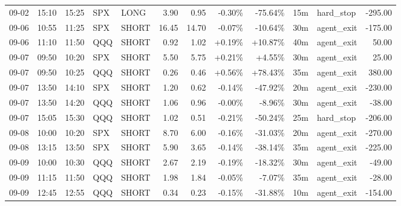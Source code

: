 \documentclass[11pt,a4paper,twoside]{article}
\begin{document}
\begin{center}
\begin{longtable}{>{\color{txtmain}}l l l l l r r r r r >{\color{txtmain}}l r}
09-02 & 15:10 & 15:25 & SPX & LONG & 3.90 & 0.95 & \textcolor{lossred}{-0.30\%} & \textcolor{lossred}{-75.64\%} & 15m & hard\_stop & \textcolor{lossred}{-295.00} \\
09-06 & 10:55 & 11:25 & SPX & SHORT & 16.45 & 14.70 & \textcolor{lossred}{-0.07\%} & \textcolor{lossred}{-10.64\%} & 30m & agent\_exit & \textcolor{lossred}{-175.00} \\
09-06 & 11:10 & 11:50 & QQQ & SHORT & 0.92 & 1.02 & \textcolor{wingreen}{+0.19\%} & \textcolor{wingreen}{+10.87\%} & 40m & agent\_exit & \textcolor{wingreen}{50.00} \\
09-07 & 09:50 & 10:20 & SPX & SHORT & 5.50 & 5.75 & \textcolor{wingreen}{+0.21\%} & \textcolor{wingreen}{+4.55\%} & 30m & agent\_exit & \textcolor{wingreen}{25.00} \\
09-07 & 09:50 & 10:25 & QQQ & SHORT & 0.26 & 0.46 & \textcolor{wingreen}{+0.56\%} & \textcolor{wingreen}{+78.43\%} & 35m & agent\_exit & \textcolor{wingreen}{380.00} \\
09-07 & 13:50 & 14:10 & SPX & SHORT & 1.20 & 0.62 & \textcolor{lossred}{-0.14\%} & \textcolor{lossred}{-47.92\%} & 20m & agent\_exit & \textcolor{lossred}{-230.00} \\
09-07 & 13:50 & 14:20 & QQQ & SHORT & 1.06 & 0.96 & \textcolor{wingreen}{-0.00\%} & \textcolor{lossred}{-8.96\%} & 30m & agent\_exit & \textcolor{lossred}{-38.00} \\
09-07 & 15:05 & 15:30 & QQQ & SHORT & 1.02 & 0.51 & \textcolor{lossred}{-0.21\%} & \textcolor{lossred}{-50.24\%} & 25m & hard\_stop & \textcolor{lossred}{-206.00} \\
09-08 & 10:00 & 10:20 & SPX & SHORT & 8.70 & 6.00 & \textcolor{lossred}{-0.16\%} & \textcolor{lossred}{-31.03\%} & 20m & agent\_exit & \textcolor{lossred}{-270.00} \\
09-08 & 13:15 & 13:50 & SPX & SHORT & 5.90 & 3.65 & \textcolor{lossred}{-0.14\%} & \textcolor{lossred}{-38.14\%} & 35m & agent\_exit & \textcolor{lossred}{-225.00} \\
09-09 & 10:00 & 10:30 & QQQ & SHORT & 2.67 & 2.19 & \textcolor{lossred}{-0.19\%} & \textcolor{lossred}{-18.32\%} & 30m & agent\_exit & \textcolor{lossred}{-49.00} \\
09-09 & 11:15 & 11:50 & QQQ & SHORT & 1.98 & 1.84 & \textcolor{lossred}{-0.05\%} & \textcolor{lossred}{-7.07\%} & 35m & agent\_exit & \textcolor{lossred}{-28.00} \\
09-09 & 12:45 & 12:55 & QQQ & SHORT & 0.34 & 0.23 & \textcolor{lossred}{-0.15\%} & \textcolor{lossred}{-31.88\%} & 10m & agent\_exit & \textcolor{lossred}{-154.00} \\

\end{longtable}
\end{center}
\end{document}
